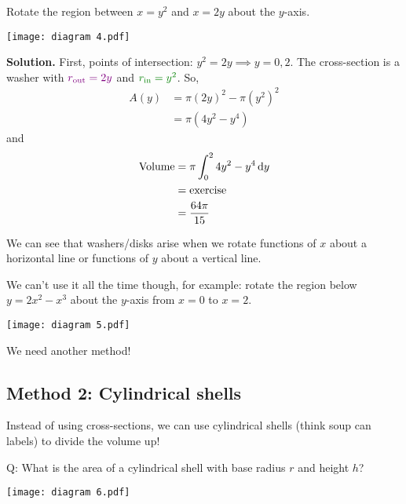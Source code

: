 \begin{Example}{}{}
    Rotate the region between $ x=y^2 $ and $ x=2y $ about the $ y $-axis.

    \begin{center}
        \texttt{[image: diagram 4.pdf]}
    \end{center}

    \textbf{Solution.} First, points of intersection: $ y^2=2y\implies y=0,2 $.
    The cross-section is a washer with $ \color[rgb]{0.5,0,0.5} r_{\text{out}}=2y $ and
    $ \color[rgb]{0,0.5,0}  r_{\text{in}}=y^2 $. So,
    \begin{align*}
        A(y)
         & =\pi\left(2y\right)^2-\pi\left(y^2\right)^2 \\
         & =\pi\left( 4y^2-y^4 \right)
    \end{align*}
    and
    \begin{align*}
        \text{Volume}
         & =\pi \int_{0}^{2} 4y^2-y^4\odif{y} \\
         & =\text{exercise}                   \\
         & =\frac{64\pi}{15}
    \end{align*}
\end{Example}

We can see that washers/disks arise when we rotate functions of $ x $ about
a horizontal line or functions of $ y $ about a vertical line.

We can't use it all the time though, for example: rotate the region below
$ y=2x^2-x^3 $ about the $ y $-axis from $ x=0 $ to $ x=2 $.

\begin{center}
    \texttt{[image: diagram 5.pdf]}
\end{center}

We need another method!

\subsection*{Method 2: Cylindrical shells}

Instead of using cross-sections, we can use cylindrical shells (think soup can labels)
to divide the volume up!

Q\@: What is the area of a cylindrical shell with base radius $ r $ and height $ h $?

\begin{center}
    \texttt{[image: diagram 6.pdf]}
\end{center}

